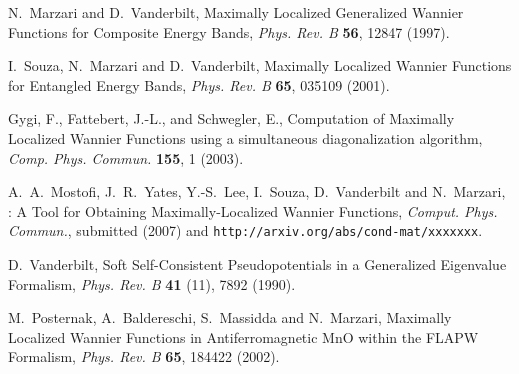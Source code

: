 \documentclass[a4paper,11pt,twoside]{book}
\begin{document}
\begin{thebibliography}{99}


 N.~Marzari and D.~Vanderbilt, 
  Maximally Localized Generalized Wannier Functions for Composite
  Energy Bands, {\it Phys. Rev. B} {\bf 56}, 12847 (1997).  

 I.~Souza, N.~Marzari and D.~Vanderbilt, Maximally
     Localized Wannier Functions for Entangled Energy Bands, {\it
     Phys. Rev. B} {\bf 65}, 035109 (2001).

 Gygi, F., Fattebert, J.-L., and Schwegler, E.,
 Computation of Maximally Localized Wannier Functions using a
 simultaneous diagonalization algorithm, {\it Comp. Phys. Commun.}
 {\bf 155}, 1 (2003).

 A.~A.~Mostofi, J.~R.~Yates, Y.-S.~Lee, I.~Souza,
   D.~Vanderbilt and N.~Marzari, \wannier: A Tool for Obtaining
   Maximally-Localized Wannier Functions, {\it Comput. Phys. Commun.},
   submitted (2007) and {\tt http://arxiv.org/abs/cond-mat/xxxxxxx}.

 D.~Vanderbilt, Soft Self-Consistent Pseudopotentials in
  a Generalized Eigenvalue Formalism, {\it Phys. Rev. B} {\bf 41}
  (11), 7892 (1990).

 M.~Posternak, A.~Baldereschi, S.~Massidda and
  N.~Marzari, Maximally Localized Wannier Functions in
  Antiferromagnetic MnO within the FLAPW Formalism, {\it Phys. Rev. B}
  {\bf 65}, 184422 (2002).



\end{thebibliography}
\end{document}
